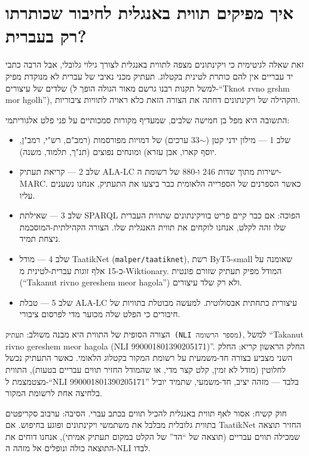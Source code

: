 \documentclass[12pt,a4paper]{article}
\begin{document}
\section{\texthebrew{איך מפיקים תווית באנגלית לחיבור שכותרתו רק בעברית?}}
\begin{hebrew}
זאת שאלה לגיטימית כי ויקינתונים מצפה לתווית באנגלית לצורך גילוי גלובלי, אבל הרבה כתבי יד עבריים אין להם כותרת לטינית בקטלוג. תעתיק מכני נאיבי של עברית לא מנוקדת מפיק שלדים של עיצורים (למשל \texthebrew{תקנות רבנו גרשם מאור הגולה} הופך ל-``Tknot rvno grshm mor hgolh''), והקהילה של ויקינתונים דחתה את הצורה הזאת כלא ראויה לתוויות ציבוריות.
\par
התשובה היא מפל בן חמישה שלבים, שמעדיף מקורות סמכותיים על פני פלט אלגוריתמי:
\begin{itemize}
  \item שלב 1 --- מילון ידני קטן ($\sim$33 ערכים) של דמויות מפורסמות (רמב"ם, רש"י, רמב"ן, יוסף קארו, אבן עזרא) ומונחים נפוצים (תנ"ך, תלמוד, משנה).
  \item שלב 2 --- קריאת תעתיק ALA-LC ישירות מתוך שדות 246 ו-880 של רשומת ה-MARC. כאשר הספרנים של הספרייה הלאומית כבר ביצעו את התעתיק, אנחנו נשענים עליו.
  \item שלב 3 --- שאילתת SPARQL הפוכה: אם כבר קיים פריט בוויקינתונים שתווית העברית שלו זהה לקלט, אנחנו לוקחים את תווית האנגלית שלו. הצורה הקהילתית-המוסכמת ניצחת תמיד.
  \item שלב 4 --- מודל TaatikNet (\texttt{malper/taatiknet}), רשת ByT5-small שאומנה על כ-15 אלף זוגות עברית-לטינית מ-Wiktionary. המודל מפיק תעתיק שזורם פונטית (``Takanut rivno gereshem meor hagola'') ולא רק שלד עיצורים.
  \item שלב 5 --- טבלת ALA-LC עיצורית כתחתית אבסולוטית. למעשה מבוטלת בתוויות של חיבורים כי הפלט שלה מכוער מדי לפרסום ציבורי.
\end{itemize}
\par
הצורה הסופית של התווית היא מבנה משולב: \texttt{תעתיק (NLI מספר הרשומה)}, למשל ``Takanut rivno gereshem meor hagola (NLI 990001801390205171)''. החלק הראשון קריא; החלק השני מצביע בצורה חד-משמעית על רשומת המקור בקטלוג הלאומי. כאשר התעתיק נכשל לחלוטין (מודל לא זמין, קלט קצר מדי, או שהמודל החזיר תווים עבריים בטעות), התווית מצטמצמת ל-``NLI 990001801390205171'' בלבד --- מזהה יציב, חד-משמעי, שתמיד יוביל בלחיצה אחת לרשומת המקור.
\par
חוק קשיח: אסור לאף תווית באנגלית להכיל תווים בכתב עברי. הסיבה: ערבוב סקריפטים בתווית גלובלית מבלבל את משתמשי ויקינתונים ופוגע בחיפוש. אם TaatikNet החזיר תוצאה שמכילה תווים עבריים (תוצאה של ``הד'' של הקלט במקום תעתיק אמיתי), אנחנו דוחים את התוצאה כולה ונופלים אל מזהה ה-NLI לבדו.
\end{hebrew}
\end{document}
